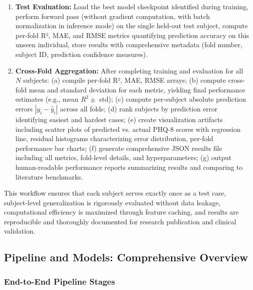 \documentclass[12pt]{article}
\begin{document}
\begin{enumerate}
		\item \textbf{Test Evaluation:} Load the best model checkpoint identified during training, perform forward pass (without gradient computation, with batch normalization in inference mode) on the single held-out test subject, compute per-fold R², MAE, and RMSE metrics quantifying prediction accuracy on this unseen individual, store results with comprehensive metadata (fold number, subject ID, prediction confidence measures).

		\item \textbf{Cross-Fold Aggregation:} After completing training and evaluation for all $N$ subjects: (a) compile per-fold R², MAE, RMSE arrays; (b) compute cross-fold mean and standard deviation for each metric, yielding final performance estimates (e.g., mean $R^2 \pm$ std); (c) compute per-subject absolute prediction errors $|y_i - \hat{y}_i|$ across all folds; (d) rank subjects by prediction error identifying easiest and hardest cases; (e) create visualization artifacts including scatter plots of predicted vs. actual PHQ-8 scores with regression line, residual histograms characterizing error distribution, per-fold performance bar charts; (f) generate comprehensive JSON results file including all metrics, fold-level details, and hyperparameters; (g) output human-readable performance reports summarizing results and comparing to literature benchmarks.
	\end{enumerate}

	This workflow ensures that each subject serves exactly once as a test case, subject-level generalization is rigorously evaluated without data leakage, computational efficiency is maximized through feature caching, and results are reproducible and thoroughly documented for research publication and clinical validation.

	\subsection{Pipeline and Models: Comprehensive Overview}

	\subsubsection{End-to-End Pipeline Stages}
\end{document}

